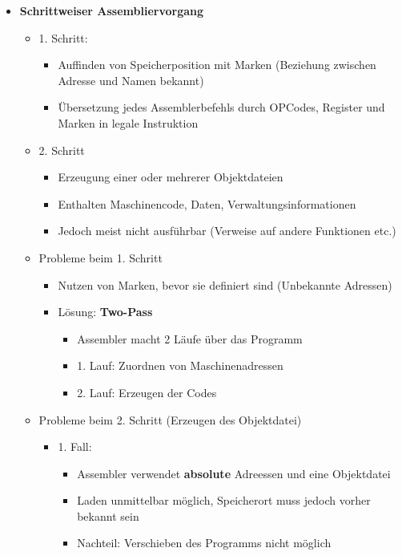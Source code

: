 \begin{itemize}
        \item \textbf{Schrittweiser Assembliervorgang}
            \begin{itemize}
                \item 1. Schritt:
                    \begin{itemize}
                        \item Auffinden von Speicherposition mit Marken (Beziehung zwischen Adresse und Namen bekannt)
                        \item Übersetzung jedes Assemblerbefehls durch OPCodes, Register und Marken in legale Instruktion
                    \end{itemize}
                \item 2. Schritt
                    \begin{itemize}
                        \item Erzeugung einer oder mehrerer Objektdateien
                        \item Enthalten Maschinencode, Daten, Verwaltungsinformationen
                        \item Jedoch meist nicht ausführbar (Verweise auf andere Funktionen etc.)
                    \end{itemize}
                \item Probleme beim 1. Schritt
                    \begin{itemize}
                        \item Nutzen von Marken, bevor sie definiert sind (Unbekannte Adressen)
                        \item Lösung: \textbf{Two-Pass}
                            \begin{itemize}
                                \item Assembler macht 2 Läufe über das Programm
                                \item 1. Lauf: Zuordnen von Maschinenadressen
                                \item 2. Lauf: Erzeugen der Codes
                            \end{itemize}
                    \end{itemize}
\pagebreak
                \item Probleme beim 2. Schritt (Erzeugen des Objektdatei)
                    \begin{itemize}
                        \item 1. Fall:
                            \begin{itemize}
                                \item Assembler verwendet \textbf{absolute} Adreessen und eine Objektdatei
                                \item Laden unmittelbar möglich, Speicherort muss jedoch vorher bekannt sein
                                \item Nachteil: Verschieben des Programms nicht möglich
                            \end{itemize}


\end{itemize}
\end{itemize}
\end{itemize}
